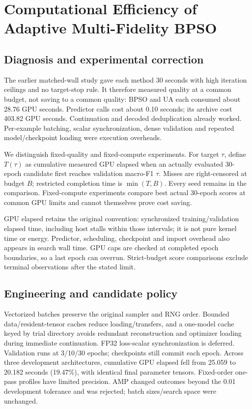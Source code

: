 \section{Computational Efficiency of Adaptive Multi-Fidelity BPSO}
\label{sec:amf-efficiency}
\subsection{Diagnosis and experimental correction}
The earlier matched-wall study gave each method 30 seconds with high iteration ceilings and no target-stop rule. It therefore measured quality at a common budget, not saving to a common quality: BPSO and UA each consumed about 28.76 GPU seconds. Predictor calls cost about 0.10 seconds; its archive cost 403.82 GPU seconds. Continuation and decoded deduplication already worked. Per-example batching, scalar synchronization, dense validation and repeated model/checkpoint loading were execution overheads.

We distinguish fixed-quality and fixed-compute experiments. For target $\tau$, define $T(\tau)$ as cumulative measured GPU elapsed when an actually evaluated 30-epoch candidate first reaches validation macro-F1 $\tau$. Misses are right-censored at budget $B$; restricted completion time is $\min(T,B)$. Every seed remains in the comparison. Fixed-compute experiments compare best actual 30-epoch scores at common GPU limits and cannot themselves prove cost saving.

GPU elapsed retains the original convention: synchronized training/validation elapsed time, including host stalls within those intervals; it is not pure kernel time or energy. Predictor, scheduling, checkpoint and import overhead also appears in search wall time. GPU caps are checked at completed epoch boundaries, so a last epoch can overrun. Strict-budget score comparisons exclude terminal observations after the stated limit.

\subsection{Engineering and candidate policy}
Vectorized batches preserve the original sampler and RNG order. Bounded data/resident-tensor caches reduce loading/transfers, and a one-model cache keyed by trial directory avoids redundant reconstruction and optimizer loading during immediate continuation. FP32 loss-scalar synchronization is deferred. Validation runs at 3/10/30 epochs; checkpoints still commit each epoch. Across three development architectures, cumulative GPU elapsed fell from 25.059 to 20.182 seconds (19.47\%), with identical final parameter tensors. Fixed-order one-pass profiles have limited precision. AMP changed outcomes beyond the 0.01 development tolerance and was rejected; batch sizes/search space were unchanged.

